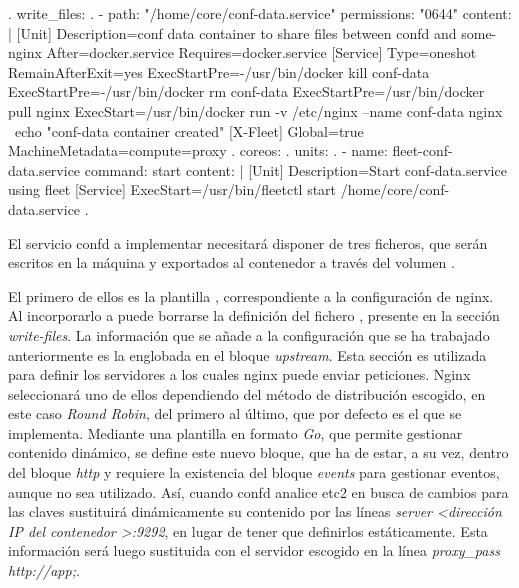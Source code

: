 \begin{codelisting}
\label{code:conf-data}
\begin{code}
.
write_files:
.
  - path: "/home/core/conf-data.service"
    permissions: "0644"
    content: |
      [Unit] 
      Description=conf data container to share files between confd and some-nginx
      After=docker.service
      Requires=docker.service
      [Service] 
      Type=oneshot
      RemainAfterExit=yes
      ExecStartPre=-/usr/bin/docker kill conf-data 
      ExecStartPre=-/usr/bin/docker rm conf-data
      ExecStartPre=/usr/bin/docker pull nginx 
      ExecStart=/usr/bin/docker run -v /etc/nginx --name conf-data nginx \
      echo "conf-data container created" 
      [X-Fleet]
      Global=true
      MachineMetadata=compute=proxy
  .
coreos:
  .
  units:
  .
  - name: fleet-conf-data.service
    command: start
    content: |
      [Unit]
      Description=Start conf-data.service using fleet
      [Service]
      ExecStart=/usr/bin/fleetctl start /home/core/conf-data.service
  .
\end{code}
\end{codelisting}

El servicio confd a implementar necesitará disponer de tres ficheros, que serán escritos en la máquina y exportados al contenedor a través del volumen .

El primero de ellos es la plantilla , correspondiente a la configuración de nginx. Al incorporarlo a  puede borrarse la definición del fichero , presente en la sección \textit{write-files}. La información que se añade a la configuración que se ha trabajado anteriormente es la englobada en el bloque \textit{upstream}. Esta sección es utilizada para definir los servidores a los cuales nginx puede enviar peticiones. Nginx seleccionará uno de ellos dependiendo del método de distribución escogido, en este caso \textit{Round Robin}, del primero al último, que por defecto es el que se implementa. Mediante una plantilla en formato \textit{Go}, que permite gestionar contenido dinámico, se define este nuevo bloque, que ha de estar, a su vez, dentro del bloque \textit{http} y requiere la existencia del bloque \textit{events} para gestionar eventos, aunque no sea utilizado. Así, cuando confd analice etc2 en busca de cambios para las claves  sustituirá dinámicamente su contenido por las líneas \textit{server <dirección IP del contenedor >:9292}, en lugar de tener que definirlos estáticamente. Esta información será luego sustituida con el servidor escogido en la línea \textit{proxy\_pass http://app;}.

